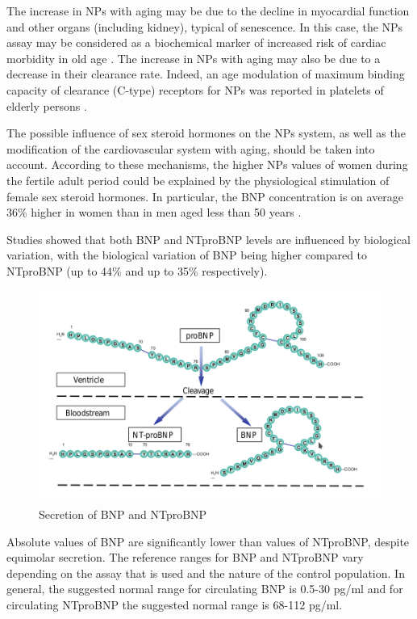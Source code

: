 \documentclass[14pt,a4paper,onecolumn]{extarticle}
\begin{document}
The increase in NPs with aging may be due to the decline in myocardial function and other organs (including kidney), typical of senescence. In this case, the NPs assay may be considered as a biochemical marker of increased risk of cardiac morbidity in old age \citep{bib316}.  The increase in NPs with aging may also be due to a decrease in their clearance rate. Indeed, an age modulation of maximum binding capacity of clearance (C-type) receptors for NPs was reported in platelets of elderly persons \citep{bib317}. %

The possible influence of sex steroid hormones on the NPs system, as well as the modification of the cardiovascular system with aging, should be taken into account. According to these mechanisms, the higher NPs values of women during the fertile adult period could be explained by the physiological stimulation of female sex steroid hormones. In particular, the BNP concentration is on average 36\% higher in women than in men aged less than 50 years \citep{bib37}. %

Studies showed that both BNP and NTproBNP levels are influenced by biological variation, with the biological variation of BNP being higher compared to NTproBNP (up to 44\% and up to 35\% respectively). \citep{Bruins2004} \citep{Wu2003b} %

\begin{figure}      \centering      \includegraphics[scale=0.4]{../../images/BNP_secretion.png}      \small\caption{Secretion of BNP and NTproBNP}      \label{BNP_secretion}  \end{figure} %

Absolute values of BNP are significantly lower than values of NTproBNP, despite equimolar secretion. The reference ranges for BNP and NTproBNP vary depending on the assay that is used and the nature of the control population. In general, the suggested normal range for circulating BNP is 0.5-30 pg/ml and for circulating NTproBNP the suggested normal range is 68-112 pg/ml. \citep{Cowie2003} %
\end{document}
